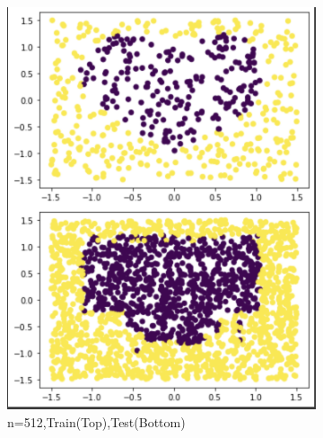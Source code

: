 \documentclass[a4paper]{article}
\theoremstyle{definition}
\newenvironment{soln}{
    \leavevmode\color{blue}\ignorespaces
}{}
\begin{document}
\begin{enumerate}
\begin{soln}
\begin{figure}[H]
\begin{subfigure}{0.5\textwidth}
            \includegraphics[scale=0.5]{512.png}
            \caption{n=512,Train(Top),Test(Bottom)}
            \label{fig:q2}
        \end{subfigure}
        \begin{subfigure}{0.5\textwidth}
            \centering

\end{subfigure}
\end{figure}
\end{soln}
\end{enumerate}
\end{document}
